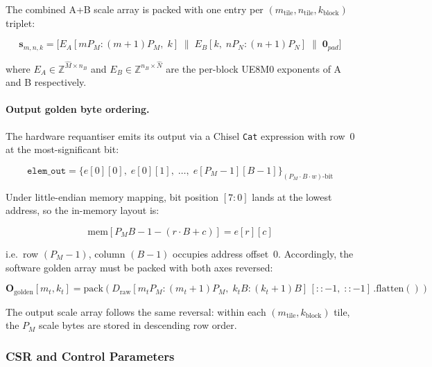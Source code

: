 The combined A+B scale array is packed with one entry per
$(m_{\mathrm{tile}}, n_{\mathrm{tile}}, k_{\mathrm{block}})$ triplet:

\begin{equation}
\mathbf{s}_{m,n,k} =
  \bigl[
    E_A[m P_M : (m{+}1)P_M,\; k] \;\|\;
    E_B[k,\; n P_N : (n{+}1)P_N] \;\|\;
    \mathbf{0}_{\mathit{pad}}
  \bigr]
\label{eq:scale_pack}
\end{equation}

where $E_A \in \mathbb{Z}^{\hat{M} \times n_B}$ and
$E_B \in \mathbb{Z}^{n_B \times \hat{N}}$ are the per-block UE8M0
exponents of A and B respectively.

\paragraph{Output golden byte ordering.}
The hardware requantiser emits its output via a Chisel \texttt{Cat}
expression with row~0 at the most-significant bit:

\begin{equation}
\mathtt{elem\_out} =
  \bigl\{e[0][0],\; e[0][1],\; \ldots,\; e[P_M{-}1][B{-}1]\bigr\}_{(P_M \cdot B \cdot w)\text{-bit}}
\label{eq:cat_hw}
\end{equation}

Under little-endian memory mapping, bit position $[7{:}0]$ lands at the
lowest address, so the in-memory layout is:

\begin{equation}
\mathrm{mem}[P_M B - 1 - (r \cdot B + c)] = e[r][c]
\label{eq:mem_layout}
\end{equation}

i.e.\ row $(P_M - 1)$, column $(B-1)$ occupies address offset~0.
Accordingly, the software golden array must be packed with both axes
reversed:

\begin{equation}
\mathbf{O}_{\mathrm{golden}}[m_t, k_t] =
  \mathrm{pack}\!\left(
    D_{\mathrm{raw}}[m_t P_M : (m_t{+}1)P_M,\;
                     k_t B  : (k_t{+}1)B]
    \,[::-1,\; ::-1]\,.\mathrm{flatten}()
  \right)
\label{eq:golden_pack}
\end{equation}

The output scale array follows the same reversal: within each
$(m_{\mathrm{tile}}, k_{\mathrm{block}})$ tile, the $P_M$ scale bytes
are stored in descending row order.

\subsubsection{CSR and Control Parameters}
\label{sec:integration:sw:csr}

